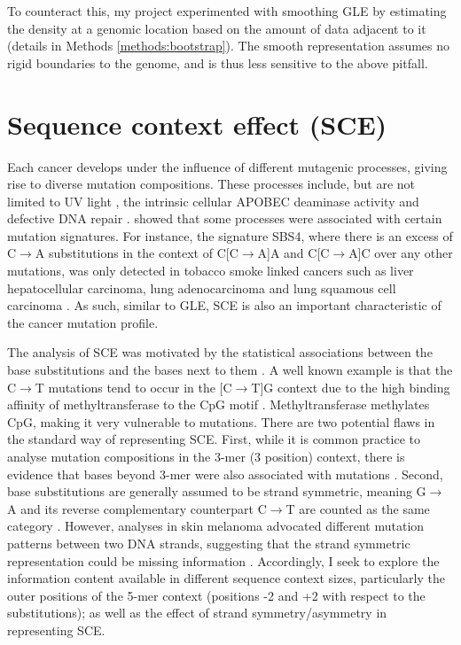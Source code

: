 To counteract this, my project experimented with smoothing GLE by estimating the \gls{density} at a genomic location based on the amount of data adjacent to it (details in Methods \ref{methods:bootstrap}). The smooth representation assumes no rigid boundaries to the genome, and is thus less sensitive to the above pitfall. 



\section{Sequence context effect (SCE)}
\label{intro:sce}

Each cancer develops under the influence of different mutagenic processes, giving rise to diverse mutation compositions. These processes include, but are not limited to UV light \citep[known to drive skin melanoma;][]{Mohania2017}, the intrinsic cellular APOBEC deaminase activity \citep[\textit{e.g.} in B cells;][]{Kuppers2005MechanismsPathogenesis} and defective DNA repair \citep[\textit{e.g.} mutated \textit{BRCA} genes in breast cancer;][]{Navasardyan2021YY1TNBC}. \citet{Alexandrov2013, Alexandrov2020} showed that some processes were associated with certain mutation signatures. For instance, the signature SBS4, where there is an excess of C$\rightarrow$A substitutions in the context of C[C$\rightarrow$A]A and C[C$\rightarrow$A]C over any other mutations, was only detected in tobacco smoke linked cancers such as liver hepatocellular carcinoma, lung adenocarcinoma and lung squamous cell carcinoma \citep{Alexandrov2020}. As such, similar to GLE, SCE is also an important characteristic of the cancer mutation profile. 

The analysis of SCE was motivated by the statistical associations between the base substitutions and the \glspl{base} next to them \citep{Zhu2017}. A well known example is that the C$\rightarrow$T mutations tend to occur in the [C$\rightarrow$T]G context due to the high binding affinity of methyltransferase to the CpG motif \citep[Figure \ref{fig:motif_demo};][]{Cooper2010}. Methyltransferase methylates CpG, making it very vulnerable to mutations. There are two potential flaws in the standard way of representing SCE. First, while it is common practice to analyse mutation compositions in the 3-mer (3 position) context, there is evidence that bases beyond 3-mer were also associated with mutations \citep{Zhu2017,Zhu2020}. Second, base substitutions are generally assumed to be strand symmetric, meaning G$\rightarrow$A and its reverse complementary counterpart C$\rightarrow$T are counted as the same category \citep[Figure \ref{fig:motif_symmetric_demo};][]{Alexandrov2013, Jiao2020}. However, analyses in skin melanoma advocated different mutation patterns between two DNA strands, suggesting that the strand symmetric representation could be missing information \citep{Zhu2017}. Accordingly, I seek to explore the information content available in different sequence context sizes, particularly the outer positions of the 5-mer context (positions -2 and +2 with respect to the substitutions); as well as the effect of strand symmetry/asymmetry in representing SCE.

